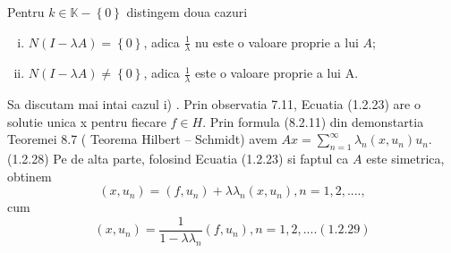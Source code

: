 \documentclass[a4paper,12pt,oneside]{report}
\begin{document}
	Pentru \(k \in \mathbb{K} - \left \{ 0 \right \}\) distingem doua cazuri 
					
	\begin{enumerate}[(i)]
		\item \(N\left ( I - \lambda A \right ) = \left \{ 0 \right \}\), adica \(\frac{1}{\lambda}\) nu este o valoare proprie a lui \(A\);
		\item \(N\left ( I - \lambda A \right ) \neq  \left \{ 0 \right \}\), adica \(\frac{1}{\lambda}\) este o valoare proprie a lui A. 
	\end{enumerate}
					
	Sa discutam mai intai cazul i) . Prin observatia 7.11, Ecuatia (1.2.23) are o solutie unica x
	pentru fiecare \(f\in H\). Prin formula (8.2.11) din demonstartia Teoremei 8.7 ( Teorema Hilbert – Schmidt) avem
	\(Ax = \sum_{n=1}^{\infty }\lambda_{n}\left ( x,u_{n} \right )u_{n}\). (1.2.28)
	Pe de alta parte, folosind Ecuatia (1.2.23) si faptul ca \(A\) este simetrica, obtinem
	\begin{displaymath}
		\left ( x,u_{n} \right ) = \left ( f,u_{n} \right ) + \lambda \lambda _{n}\left ( x,u_{n} \right ), n = 1,2,....,
	\end{displaymath}
	cum 
	\begin{displaymath}
		\left ( x,u_{n} \right ) = \frac{1}{1 - \lambda \lambda _{n}}\left ( f,u_{n} \right ), n = 1,2,.... (1.2.29)
	\end{displaymath}
					
\end{document}
